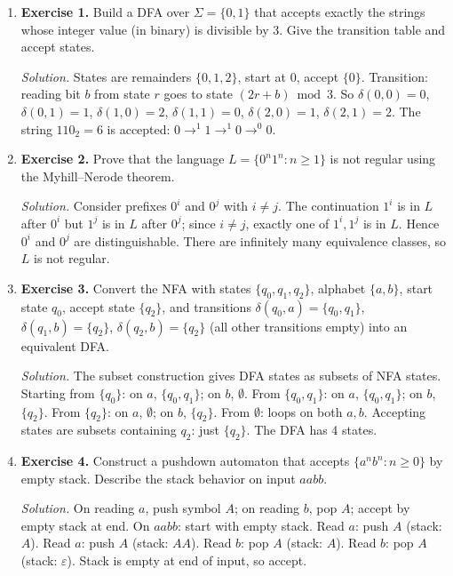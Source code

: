 \begin{enumerate}[leftmargin=*,itemsep=0.9em]

\item \textbf{Exercise 1.} Build a DFA over $\Sigma=\{0,1\}$ that accepts exactly the strings whose integer value (in binary) is divisible by 3. Give the transition table and accept states.

\emph{Solution.} States are remainders $\{0,1,2\}$, start at $0$, accept $\{0\}$. Transition: reading bit $b$ from state $r$ goes to state $(2r+b)\bmod 3$. So $\delta(0,0)=0$, $\delta(0,1)=1$, $\delta(1,0)=2$, $\delta(1,1)=0$, $\delta(2,0)=1$, $\delta(2,1)=2$. The string $110_2=6$ is accepted: $0\to^1 1\to^1 0\to^0 0$.

\item \textbf{Exercise 2.} Prove that the language $L=\{0^n1^n:n\ge 1\}$ is not regular using the Myhill--Nerode theorem.

\emph{Solution.} Consider prefixes $0^i$ and $0^j$ with $i\ne j$. The continuation $1^i$ is in $L$ after $0^i$ but $1^j$ is in $L$ after $0^j$; since $i\ne j$, exactly one of $1^i,1^j$ is in $L$. Hence $0^i$ and $0^j$ are distinguishable. There are infinitely many equivalence classes, so $L$ is not regular.

\item \textbf{Exercise 3.} Convert the NFA with states $\{q_0,q_1,q_2\}$, alphabet $\{a,b\}$, start state $q_0$, accept state $\{q_2\}$, and transitions $\delta(q_0,a)=\{q_0,q_1\}$, $\delta(q_1,b)=\{q_2\}$, $\delta(q_2,b)=\{q_2\}$ (all other transitions empty) into an equivalent DFA.

\emph{Solution.} The subset construction gives DFA states as subsets of NFA states. Starting from $\{q_0\}$: on $a$, $\{q_0,q_1\}$; on $b$, $\emptyset$. From $\{q_0,q_1\}$: on $a$, $\{q_0,q_1\}$; on $b$, $\{q_2\}$. From $\{q_2\}$: on $a$, $\emptyset$; on $b$, $\{q_2\}$. From $\emptyset$: loops on both $a,b$. Accepting states are subsets containing $q_2$: just $\{q_2\}$. The DFA has 4 states.

\item \textbf{Exercise 4.} Construct a pushdown automaton that accepts $\{a^nb^n:n\ge 0\}$ by empty stack. Describe the stack behavior on input $aabb$.

\emph{Solution.} On reading $a$, push symbol $A$; on reading $b$, pop $A$; accept by empty stack at end. On $aabb$: start with empty stack. Read $a$: push $A$ (stack: $A$). Read $a$: push $A$ (stack: $AA$). Read $b$: pop $A$ (stack: $A$). Read $b$: pop $A$ (stack: $\varepsilon$). Stack is empty at end of input, so accept.


\end{enumerate}
